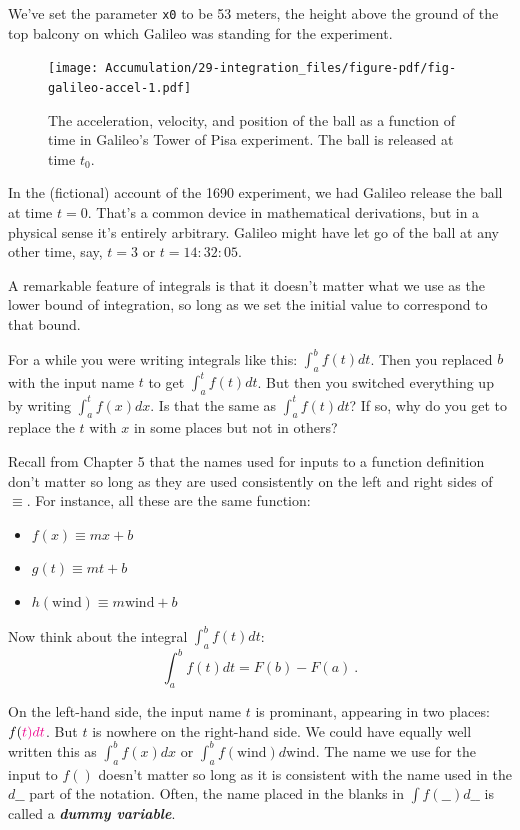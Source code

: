 \documentclass[
  letterpaper,
  DIV=11,
  numbers=noendperiod,
  oneside]{scrreprt}
\providecommand{\tightlist}{%
  \setlength{\itemsep}{0pt}\setlength{\parskip}{0pt}}
\begin{document}
We've set the parameter \texttt{x0} to be 53 meters, the height above
the ground of the top balcony on which Galileo was standing for the
experiment.

\begin{figure}

{\centering \texttt{[image: Accumulation/29-integration\_files/figure-pdf/fig-galileo-accel-1.pdf]}

}

\caption{\label{fig-galileo-accel}The acceleration, velocity, and
position of the ball as a function of time in Galileo's Tower of Pisa
experiment. The ball is released at time \(t_0\).}

\end{figure}

In the (fictional) account of the 1690 experiment, we had Galileo
release the ball at time \(t=0\). That's a common device in mathematical
derivations, but in a physical sense it's entirely arbitrary. Galileo
might have let go of the ball at any other time, say, \(t=3\) or
\(t=14:32:05\).

A remarkable feature of integrals is that it doesn't matter what we use
as the lower bound of integration, so long as we set the initial value
to correspond to that bound.

For a while you were writing integrals like this: \(\int_a^b f(t) dt\).
Then you replaced \(b\) with the input name \(t\) to get
\(\int_a^t f(t) dt\). But then you switched everything up by writing
\(\int_a^t f(x) dx\). Is that the same as \(\int_a^t f(t) dt\)? If so,
why do you get to replace the \(t\) with \(x\) in some places but not in
others?

Recall from Chapter 5 that the names used for inputs to a function
definition don't matter so long as they are used consistently on the
left and right sides of \(\equiv\). For instance, all these are the same
function:

\begin{itemize}
\tightlist
\item
  \(f(x) \equiv m x + b\)
\item
  \(g(t) \equiv m t + b\)
\item
  \(h(\text{wind}) \equiv m \text{wind} + b\)
\end{itemize}

Now think about the integral \(\int_a^b f(t) dt\):
\[\int_a^b f(t) dt = F(b) - F(a)\ .\]

On the left-hand side, the input name \(t\) is prominant, appearing in
two places: \(f(\color{magenta}{t}) d\color{magenta}{t}\). But \(t\) is
nowhere on the right-hand side. We could have equally well written this
as \(\int_a^b f(x) dx\) or \(\int_a^b f(\text{wind}) d\text{wind}\). The
name we use for the input to \(f()\) doesn't matter so long as it is
consistent with the name used in the \(d\_\_\) part of the notation.
Often, the name placed in the blanks in \(\int f(\_\_) d\_\_\) is called
a \textbf{\emph{dummy variable}}.
\end{document}
